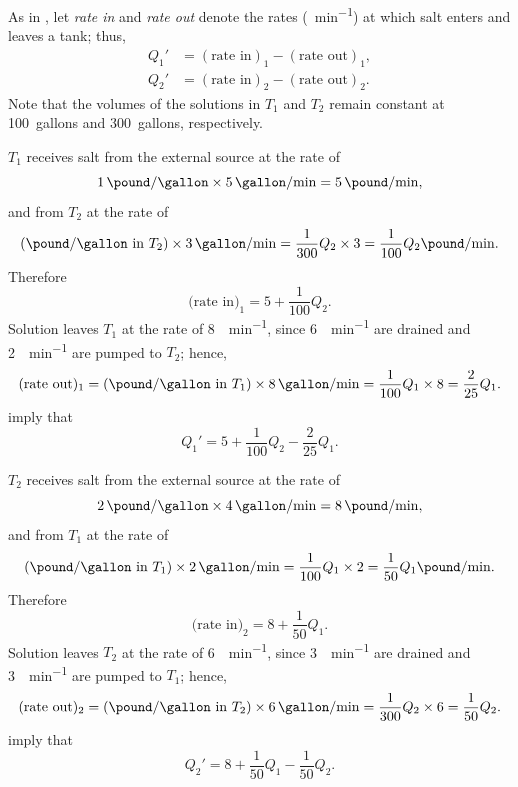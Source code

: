 \begin{solution}
As in , let \emph{\color{blue}rate in} and
\emph{\color{blue}rate out} denote the rates (\unit{\pound\per\minute}) at which salt enters and
leaves a tank; thus,
\begin{align*}
Q_1'&=(\text{rate in})_1-(\text{rate out})_1,\\
Q_2'&=(\text{rate in})_2-(\text{rate out})_2.
\end{align*}
Note that the volumes of the solutions in $T_1$ and $T_2$
remain constant at 100~gallons and 300~gallons, respectively.

$T_1$ receives salt from the external source at the rate of
\[
\qty{1}{\pound\per\gallon}\times\qty{5}{\gallon\per\minute}
=\qty{5}{\pound\per\minute},
\]
and from $T_2$ at the rate of
\[
(\unit{\pound\per\gallon}\text{ in }T_2)\times\qty{3}{\gallon\per\minute}
=\frac{1}{300}Q_2\times3=\frac{1}{100}Q_2 \unit{\pound\per\minute}.
\]
Therefore
\begin{equation} \label{eq:10.1.1}
\textrm{(rate in)}_1= 5+\frac{1}{100}Q_2.
\end{equation}
Solution leaves $T_1$  at the rate of \qty{8}{\gallon\per\minute}, since \qty{6}{\gallon\per\minute} are
drained and \qty{2}{\gallon\per\minute} are pumped to $T_2$; hence,
\begin{equation} \label{eq:10.1.2}
(\textrm{rate out})_1
=(\unit{\pound\per\gallon}\text{ in }T_1)\times \qty{8}{\gallon\per\minute}
=\frac{1}{100}Q_1\times8=\frac{2}{25}Q_1.
\end{equation}
  imply that
\begin{equation} \label{eq:10.1.3}
Q_1'=5+\frac{1}{100}Q_2-\frac{2}{25}Q_1.
\end{equation}

$T_2$ receives salt from the external source at the rate of
\[
\qty{2}{\pound\per\gallon}\times\qty{4}{\gallon\per\minute}
=\qty{8}{\pound\per\minute},
\]
and from $T_1$ at the rate of
\[
(\unit{\pound\per\gallon}\textrm{ in }T_1)\times\qty{2}{\gallon\per\minute}
=\frac{1}{100}Q_1\times2=\frac{1}{50}Q_1 \unit{\pound\per\minute}.
\]
Therefore
\begin{equation} \label{eq:10.1.4}
\textrm{(rate in)}_2= 8+\frac{1}{50}Q_1.
\end{equation}
Solution leaves $T_2$  at the rate of \qty{6}{\gallon\per\minute},
since \qty{3}{\gallon\per\minute} are
drained and \qty{3}{\gallon\per\minute} are pumped to $T_1$; hence,
\begin{equation} \label{eq:10.1.5}
(\textrm{rate out})_2
=(\unit{\pound\per\gallon}\textrm{ in }T_2)\times\qty{6}{\gallon\per\minute}
=\frac{1}{300}Q_2\times6=\frac{1}{50}Q_2.
\end{equation}
 imply that
\begin{equation} \label{eq:10.1.6}
Q_2'=8+\frac{1}{50}Q_1-\frac{1}{50}Q_2.
\end{equation}


\end{solution}

